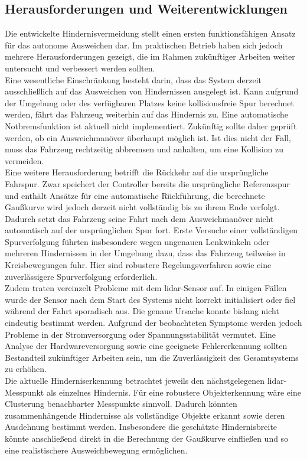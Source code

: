 \subsection{Herausforderungen und Weiterentwicklungen}
Die entwickelte Hindernisvermeidung stellt einen ersten funktionsfähigen Ansatz für das autonome Ausweichen dar. Im praktischen Betrieb haben sich jedoch mehrere Herausforderungen gezeigt, die im Rahmen zukünftiger Arbeiten weiter untersucht und verbessert werden sollten.
\\
Eine wesentliche Einschränkung besteht darin, dass das System derzeit ausschließlich auf das Ausweichen von Hindernissen ausgelegt ist. Kann aufgrund der Umgebung oder des verfügbaren Platzes keine kollisionsfreie Spur berechnet werden, fährt das Fahrzeug weiterhin auf das Hindernis zu. Eine automatische Notbremsfunktion ist aktuell nicht implementiert. Zukünftig sollte daher geprüft werden, ob ein Ausweichmanöver überhaupt möglich ist. Ist dies nicht der Fall, muss das Fahrzeug rechtzeitig abbremsen und anhalten, um eine Kollision zu vermeiden.
\\
Eine weitere Herausforderung betrifft die Rückkehr auf die ursprüngliche Fahrspur. Zwar speichert der Controller bereits die ursprüngliche Referenzspur und enthält Ansätze für eine automatische Rückführung, die berechnete Gaußkurve wird jedoch derzeit nicht vollständig bis zu ihrem Ende verfolgt. Dadurch setzt das Fahrzeug seine Fahrt nach dem Ausweichmanöver nicht automatisch auf der ursprünglichen Spur fort. Erste Versuche einer vollständigen Spurverfolgung führten insbesondere wegen ungenauen Lenkwinkeln oder mehreren Hindernissen in der Umgebung dazu, dass das Fahrzeug teilweise in Kreisbewegungen fuhr. Hier sind robustere Regelungsverfahren sowie eine zuverlässigere Spurverfolgung erforderlich.
\\
Zudem traten vereinzelt Probleme mit dem \gls{lidar}-Sensor auf. In einigen Fällen wurde der Sensor nach dem Start des Systems nicht korrekt initialisiert oder fiel während der Fahrt sporadisch aus. Die genaue Ursache konnte bislang nicht eindeutig bestimmt werden. Aufgrund der beobachteten Symptome werden jedoch Probleme in der Stromversorgung oder Spannungsstabilität vermutet. Eine Analyse der Hardwareversorgung sowie eine geeignete Fehlererkennung sollten Bestandteil zukünftiger Arbeiten sein, um die Zuverlässigkeit des Gesamtsystems zu erhöhen.
\\
Die aktuelle Hinderniserkennung betrachtet jeweils den nächstgelegenen \gls{lidar}-Messpunkt als einzelnes Hindernis. Für eine robustere Objekterkennung wäre eine Clusterung benachbarter Messpunkte sinnvoll. Dadurch könnten zusammenhängende Hindernisse als vollständige Objekte erkannt sowie deren Ausdehnung bestimmt werden. Insbesondere die geschätzte Hindernisbreite könnte anschließend direkt in die Berechnung der Gaußkurve einfließen und so eine realistischere Ausweichbewegung ermöglichen.
